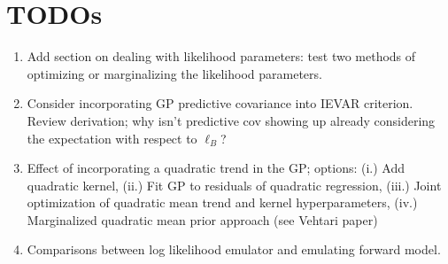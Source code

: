 \documentclass[12pt]{article}
\begin{document}
\section{TODOs}
\begin{enumerate}
\item Add section on dealing with likelihood parameters: test two methods of optimizing or marginalizing the likelihood parameters. 
\item Consider incorporating GP predictive covariance into IEVAR criterion. Review derivation; why isn't predictive cov showing up already considering the 
expectation with respect to $\ell_B$? 
\item Effect of incorporating a quadratic trend in the GP; options: (i.) Add quadratic kernel, (ii.) Fit GP to residuals of quadratic regression, (iii.) Joint optimization 
of quadratic mean trend and kernel hyperparameters, (iv.) Marginalized quadratic mean prior approach (see Vehtari paper) 
\item Comparisons between log likelihood emulator and emulating forward model. 
\end{enumerate}

 

\end{document}

